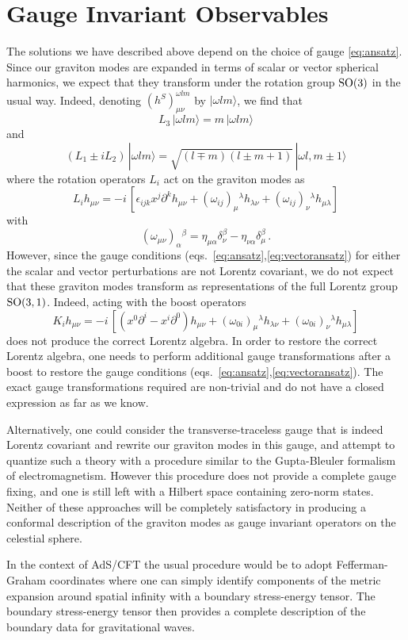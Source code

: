 \documentclass{brownthesis}
\begin{document}
\section{Gauge Invariant Observables}

The solutions we have described above depend on the choice of gauge
\eqref{eq:ansatz}. Since our graviton modes are expanded in terms
of scalar or vector spherical harmonics, we expect that they transform
under the rotation group ${\rm SO(3)}$ in the usual way. Indeed,
denoting $(h^{S})_{\mu\nu}^{\omega lm}$ by $|\omega lm\rangle$,
we find that
\[
L_{3}\,|\omega lm\rangle=m\,|\omega lm\rangle
\]
and
\[
(L_{1}\pm iL_{2})\,|\omega lm\rangle=\sqrt{(l\mp m)(l\pm m+1)}\,|\omega l,m\pm1\rangle
\]
where the rotation operators $L_{i}$ act on the graviton modes as
\[
L_{i}h_{\mu\nu}=-i\,[\epsilon_{ijk}x^{j}\partial^{k}h_{\mu\nu}+(\omega_{ij})_{\mu}{}^{\lambda}h_{\lambda\nu}+(\omega_{ij})_{\nu}{}^{\lambda}h_{\mu\lambda}]
\]
with
\[
(\omega_{\mu\nu})_{\alpha}{}^{\beta}=\eta_{\mu\alpha}\delta_{\nu}^{\beta}-\eta_{\nu\alpha}\delta_{\mu}^{\beta}\,.
\]
However, since the gauge conditions (eqs.~\ref{eq:ansatz},\ref{eq:vectoransatz})
for either the scalar and vector perturbations are not Lorentz covariant,
we do not expect that these graviton modes transform as representations
of the full Lorentz group ${\rm SO(3,1)}$. Indeed, acting with the
boost operators
\[
K_{i}h_{\mu\nu}=-i\,[(x^{0}\partial^{i}-x^{i}\partial^{0})h_{\mu\nu}+(\omega_{0i})_{\mu}{}^{\lambda}h_{\lambda\nu}+(\omega_{0i})_{\nu}{}^{\lambda}h_{\mu\lambda}]
\]
does not produce the correct Lorentz algebra. In order to restore
the correct Lorentz algebra, one needs to perform additional gauge
transformations after a boost to restore the gauge conditions (eqs.~\ref{eq:ansatz},\ref{eq:vectoransatz}).
The exact gauge transformations required are non-trivial and do not
have a closed expression as far as we know.

Alternatively, one could consider the transverse-traceless gauge that
is indeed Lorentz covariant and rewrite our graviton modes in this
gauge, and attempt to quantize such a theory with a procedure similar
to the Gupta-Bleuler formalism of electromagnetism. However this procedure
does not provide a complete gauge fixing, and one is still left with
a Hilbert space containing zero-norm states. Neither of these approaches
will be completely satisfactory in producing a conformal description
of the graviton modes as gauge invariant operators on the celestial
sphere.

In the context of AdS/CFT the usual procedure would be to adopt Fefferman-Graham
coordinates where one can simply identify components of the metric
expansion around spatial infinity with a boundary stress-energy tensor.
The boundary stress-energy tensor then provides a complete description
of the boundary data for gravitational waves.
\end{document}
